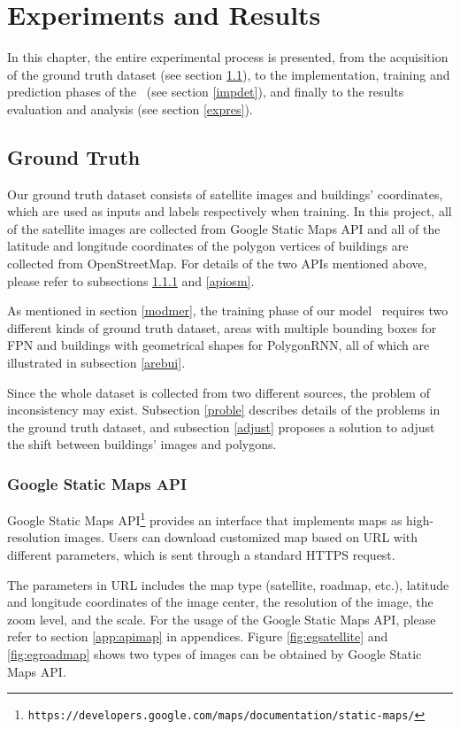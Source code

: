 \chapter{Experiments and Results}

In this chapter, the entire experimental process is presented, from the acquisition of the ground truth dataset (see section \ref{gt}), to the implementation, training and prediction phases of the \modelnameshort\ (see section \ref{impdet}), and finally to the results evaluation and analysis (see section \ref{expres}).

\section{Ground Truth}\label{gt}

Our ground truth dataset consists of satellite images and buildings' coordinates, which are used as inputs and labels respectively when training. In this project, all of the satellite images are collected from Google Static Maps API and all of the latitude and longitude coordinates of the polygon vertices of buildings are collected from OpenStreetMap. For details of the two APIs mentioned above, please refer to subsections \ref{apimap} and \ref{apiosm}.

As mentioned in section \ref{modmer}, the training phase of our model \modelnameshort\ requires two different kinds of ground truth dataset, areas with multiple bounding boxes for FPN and buildings with geometrical shapes for PolygonRNN, all of which are illustrated in subsection \ref{arebui}.

Since the whole dataset is collected from two different sources, the problem of inconsistency may exist. Subsection \ref{proble} describes details of the problems in the ground truth dataset, and subsection \ref{adjust} proposes a solution to adjust the shift between buildings' images and polygons.

\subsection{Google Static Maps API}\label{apimap}

Google Static Maps API\footnote{\lstinline{https://developers.google.com/maps/documentation/static-maps/}} provides an interface that implements maps as high-resolution images. Users can download customized map based on URL with different parameters, which is sent through a standard HTTPS request.

The parameters in URL includes the map type (satellite, roadmap, etc.), latitude and longitude coordinates of the image center, the resolution of the image, the zoom level, and the scale. For the usage of the Google Static Maps API, please refer to section \ref{app:apimap} in appendices. Figure \ref{fig:egsatellite} and \ref{fig:egroadmap} shows two types of images can be obtained by Google Static Maps API.

